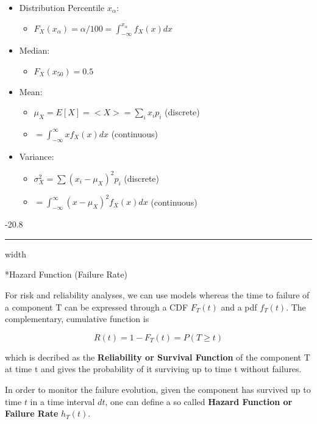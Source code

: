 \documentclass[8pt, landscape, fleqn]{scrartcl}
\makeatletter
\renewcommand{\subsubsection}{\@startsection{subsubsection}{1}{0mm}%
{-2\baselineskip}{0.8\baselineskip}%
{\hrule depth 0.2pt width\columnwidth\vspace*{1.2em}\normalsize\bfseries\rmfamily}}
\makeatother
\begin{document}
\begin{multicols*}{3}
\begin{itemize}
    \item Distribution Percentile $x_\alpha$:
    \begin{itemize}
        \item $F_X(x_\alpha) = \alpha / 100 = \int_{-\infty}^{x_\alpha} f_X(x)dx$
    \end{itemize}
    \item Median:
    \begin{itemize}
        \item $F_X(x_50) = 0.5$
    \end{itemize}
    \item Mean:
    \begin{itemize}
        \item $\mu_X = E[X] = <X> = \sum_i x_i p_i$ (discrete)
        \item $= \int_{-\infty}^{\infty} x f_X(x) dx$ (continuous)
    \end{itemize}
    \item Variance:
    \begin{itemize}
        \item $\sigma_X^2 = \sum(x_i - \mu_X)^2 p_i$ (discrete)
        \item $ = \int_{-\infty}^\infty (x-\mu_X)^2 f_X(x) dx$ (continuous)
    \end{itemize}
\end{itemize}

\subsubsection*{Hazard Function (Failure Rate)}

 For risk and reliability analyses, we can use models whereas the time to failure of a component T can be expressed through a CDF $F_T(t)$ and a pdf $f_T(t)$. The complementary, cumulative function is 
 
 \begin{equation}
    R(t) = 1-F_T(t) = P(T\geq t)
 \end{equation}   

 which is decribed as the \textbf{Reliability or Survival Function} of the component T at time t and gives the probability of it surviving up to time t without failures. \newline 

 In order to monitor the failure evolution, given the component has survived up to time $t$ in a time interval $dt$, one can define a so called \textbf{Hazard Function or Failure Rate} $h_T(t)$. 


\end{multicols*}
\end{document}
